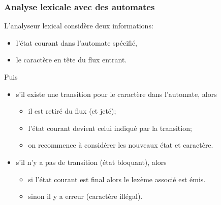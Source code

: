 %
\begin{frame}
\frametitle{Analyse lexicale avec des automates}

\label{algo_lex_auto}

L'analyseur lexical considère deux informations:

\begin{itemize}

  \item l'état courant dans l'automate spécifié,

  \item le caractère en tête du flux entrant.

\end{itemize}

Puis

\begin{itemize}

  \item s'il existe une transition pour le caractère dans l'automate,
  alors

    \begin{itemize}

      \item il est retiré du flux (et jeté);

      \item l'état courant devient celui indiqué par la transition;

      \item on recommence à considérer les nouveaux état et
      caractère.

    \end{itemize}

  \item s'il n'y a pas de transition (état bloquant), alors

    \begin{itemize}

      \item si l'état courant est final alors le lexème associé est
      émis.

      \item sinon il y a erreur (caractère illégal).

    \end{itemize}

\end{itemize}

\end{frame}

